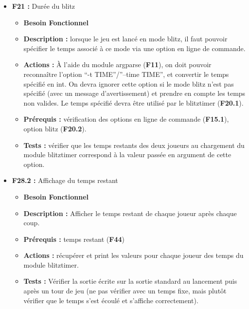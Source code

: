 \documentclass{article}
\begin{document}
\begin{itemize}
\begin{itemize}
\begin{itemize}
\begin{itemize}
                \item \textbf{Tests :} vérifier que, lorsque l’option de swap est activée et que le deuxième joueur tape ‘y’, le pion du premier joueur est remplacé par le pion du deuxième. De même, vérifier que le pion n’est pas remplacé si le deuxième joueur tape ‘n’.
            \end{itemize}
        \end{itemize}
    \end{itemize}
\bigskip
    \item \textbf{F21 :} Durée du blitz
    \begin{itemize}
        \item \textbf{Besoin Fonctionnel}
        \item \textbf{Description :} lorsque le jeu est lancé en mode blitz, il faut pouvoir spécifier le temps associé à ce mode via une option en ligne de commande.
        \item \textbf{Actions :} À l’aide du module argparse (\textbf{F11}), on doit pouvoir reconnaître l’option “-t TIME”/”--time TIME”, et convertir le temps spécifié en int. On devra ignorer cette option si le mode blitz n’est pas spécifié (avec un message d’avertissement) et prendre en compte les temps non valides. Le temps spécifié devra être utilisé par le blitztimer (\textbf{F20.1}).
        \item \textbf{Prérequis :} vérification des options en ligne de commande (\textbf{F15.1}), option blitz (\textbf{F20.2}).
        \item \textbf{Tests :} vérifier que les temps restants des deux joueurs au chargement du module blitztimer correspond à la valeur passée en argument de cette option.
    \end{itemize}
\bigskip
    \item \textbf{F28.2 :} Affichage du temps restant
    \begin{itemize}
        \item \textbf{Besoin Fonctionnel}
        \item \textbf{Description :} Afficher le temps restant de chaque joueur après chaque coup.
        \item \textbf{Prérequis :} temps restant (\textbf{F44})
        \item \textbf{Actions :} récupérer et print les valeurs pour chaque joueur des temps du module blitztimer.
        \item \textbf{Tests :} Vérifier la sortie écrite sur la sortie standard au lancement puis après un tour de jeu (ne pas vérifier avec un temps fixe, mais plutôt vérifier que le temps s’est écoulé et s’affiche correctement).
    \end{itemize}
\end{itemize}
\end{document}

